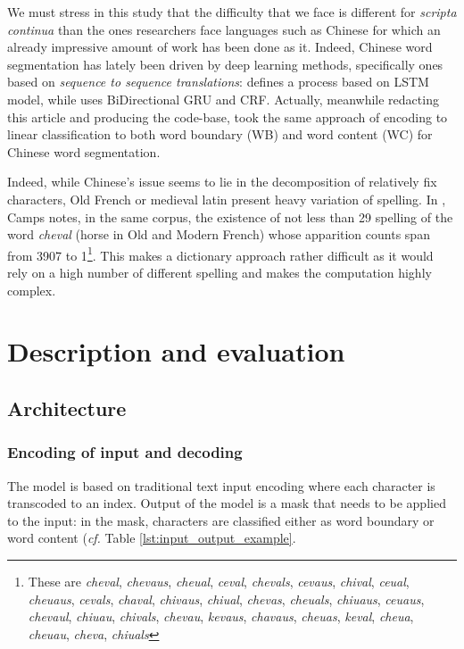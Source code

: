 \documentclass{jdmdh}
\begin{document}
We must stress in this study that the difficulty that we face is different for \textit{scripta continua} than the ones researchers face languages such as Chinese for which an already impressive amount of work has been done as it. Indeed, Chinese word segmentation has lately been driven by deep learning methods, specifically ones based on \textit{sequence to sequence translations}: \citet{chen2015long} defines a process based on LSTM model, while \citet{yu2019learning} uses BiDirectional GRU and CRF. Actually, meanwhile redacting this article and producing the code-base, \citet{huang2019realistic} took the same approach of encoding to linear classification to both word boundary (WB) and word content (WC) for Chinese word segmentation.

Indeed, while Chinese's issue seems to lie in the decomposition of relatively fix characters, Old French or medieval latin present heavy variation of spelling. In \citet{camps_pandora}, Camps notes, in the same corpus, the existence of not less than 29 spelling of the word \textit{cheval} (horse in Old and Modern French) whose apparition counts span from 3907 to 1\footnote{These are \textit{cheval}, \textit{chevaus}, \textit{cheual}, \textit{ceval}, \textit{chevals}, \textit{cevaus}, \textit{chival}, \textit{ceual}, \textit{cheuaus}, \textit{cevals}, \textit{chaval}, \textit{chivaus}, \textit{chiual}, \textit{chevas}, \textit{cheuals}, \textit{chiuaus}, \textit{ceuaus}, \textit{chevaul}, \textit{chiuau}, \textit{chivals}, \textit{chevau}, \textit{kevaus}, \textit{chavaus}, \textit{cheuas}, \textit{keval}, \textit{cheua}, \textit{cheuau}, \textit{cheva}, \textit{chiuals}}. This  makes a dictionary approach rather difficult as it would rely on a high number of different spelling and makes the computation highly complex.

\section{Description and evaluation}

\subsection{Architecture}

\subsubsection{Encoding of input and decoding}

The model is based on traditional text input encoding where each character is transcoded to an index. Output of the model is a mask that needs to be applied to the input: in the mask, characters are classified either as word boundary or word content (\textit{cf.} Table \ref{lst:input_output_example}.
\end{document}
